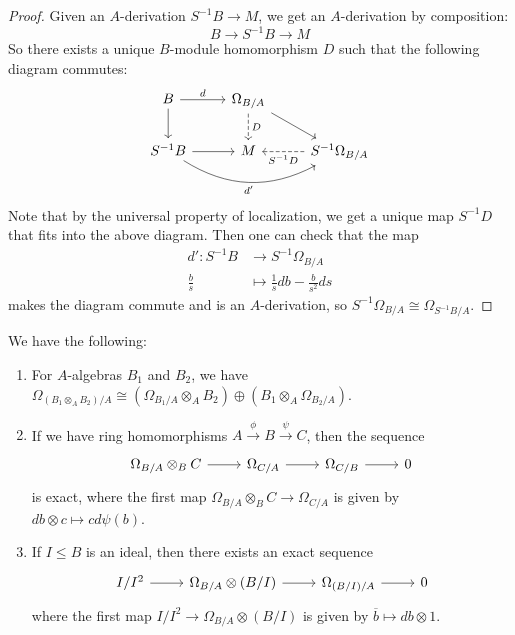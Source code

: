 \begin{proof}
  Given an $A$-derivation
  $S^{-1} B \to M$, we get an $A$-derivation
  by composition:
  \[
    B \longrightarrow S^{-1} B \longrightarrow M
  \]
  So there exists
  a unique $B$-module homomorphism
  $D$ such that the following
  diagram commutes:
  \pagebreak
  \[
    \begin{tikzcd}
      B \ar[d] \ar[r, "d"] & \Omega_{B / A} \ar[d, "D", dashed] \ar[dr] \\
      S^{-1} B \ar[r] \ar[rr, bend right, "d'", swap] & M & S^{-1} \Omega_{B / A} \ar[l, dashed, "S^{-1} D"]
    \end{tikzcd}
  \]
  Note that by the universal property of
  localization,
  we get a unique map $S^{-1} D$ that
  fits into the above diagram. Then
  one can check that the map
  \begin{align*}
    d' : S^{-1} B &\longrightarrow S^{-1} \Omega_{B / A} \\
    \frac{b}{s} &\longmapsto \frac{1}{s} db - \frac{b}{s^2} ds
  \end{align*}
  makes the diagram commute and is
  an $A$-derivation, so
  $S^{-1} \Omega_{B / A} \cong \Omega_{S^{-1} B / A}$.
\end{proof}

\begin{prop}\label{prop:properties-differentials}
  We have the following:
  \begin{enumerate}
    \item For $A$-algebras $B_1$ and
      $B_2$, we have
      $\Omega_{(B_1 \otimes_A B_2) / A} \cong (\Omega_{B_1 / A} \otimes_A B_2) \oplus (B_1 \otimes_A \Omega_{B_2 / A})$.
    \item If we have ring homomorphisms
      $A \overset{\phi}{\longrightarrow} B \overset{\psi}{\longrightarrow} C$, then
      the sequence
      \[
        \begin{tikzcd}
          \Omega_{B / A} \otimes_B C \ar[r]
          & \Omega_{C / A} \ar[r] &
          \Omega_{C / B} \ar[r] & 0
        \end{tikzcd}
      \]
      is exact, where the
      first map $\Omega_{B / A} \otimes_B C \to \Omega_{C / A}$ is given by
      $db \otimes c \mapsto c d\psi(b)$.
    \item If $I \le B$ is an ideal, then
      there exists an exact sequence
      \[
        \begin{tikzcd}
          I / I^2 \ar[r]
          & \Omega_{B / A} \otimes (B / I) \ar[r]
          & \Omega_{(B / I) / A} \ar[r]
          & 0
        \end{tikzcd}
      \]
      where the first map
      $I / I^2 \to \Omega_{B / A} \otimes (B / I)$ is given by
      $\overline{b} \mapsto db \otimes 1$.
  \end{enumerate}
\end{prop}

